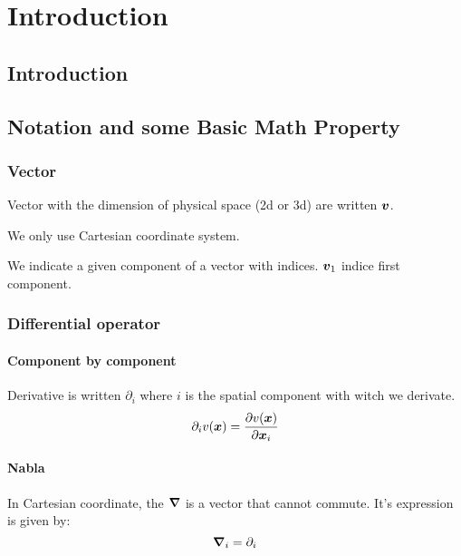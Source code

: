 \chapter{Introduction}
\minitoc
\section{Introduction}

\section{Notation and some Basic Math Property}

\subsection{Vector}

Vector with the dimension of physical space (2d or 3d) are written ${\boldsymbol {v}}$.

We only use Cartesian coordinate system.

We indicate a given component of a vector with indices. ${\boldsymbol {v}}_1$ indice first component.

\subsection{Differential operator}

\subsubsection{Component by component}

Derivative is written $\partial_i$ where $i$ is the spatial component with witch we derivate.
\begin{equation}
 \partial_i v({\boldsymbol {x}})=\frac{\partial v({\boldsymbol {x}})}{\partial {\boldsymbol {x}}_{i}}
\end{equation}

\subsubsection{Nabla}

\begin{definition}
 In Cartesian coordinate, the ${\boldsymbol {\nabla}}$ is a vector that cannot commute.
 It's expression is given by:
 \begin{equation}
 {\boldsymbol {\nabla}}_{i}=\partial_{i}
 \end{equation}
\end{definition}

